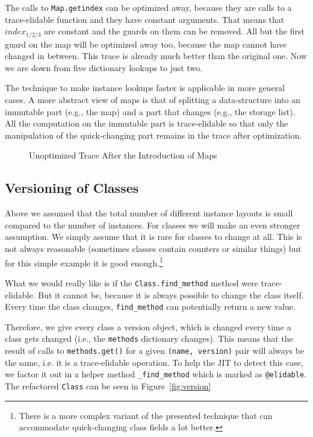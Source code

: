 \documentclass[preprint]{sigplanconf}
\newcommand\eg{e.g.,\xspace}
\begin{document}
The calls to \texttt{Map.getindex} can be optimized away, because they are calls to
a trace-elidable function and they have constant arguments. That means that $index_{1/2/3}$
are constant and the guards on them can be removed. All but the first guard on
the map will be optimized away too, because the map cannot have changed in
between. This trace is already much better than
the original one. Now we are down from five dictionary lookups to just two.

The technique to make instance lookups faster is applicable in more general
cases. A more abstract view of maps is that of splitting a data-structure into
an immutable part (\eg the map) and a part that changes (\eg the storage list).
All the computation on the immutable part is trace-elidable so that only the
manipulation of the quick-changing part remains in the trace after
optimization.

\begin{figure}

\caption{Unoptimized Trace After the Introduction of Maps}
\label{fig:trace2}
\end{figure}





\subsection{Versioning of Classes}

Above we assumed that the total number of
different instance layouts is small compared to the number of instances. For classes we
will make an even stronger assumption. We simply assume that it is rare for
classes to change at all. This is not always reasonable (sometimes classes contain
counters or similar things) but for this simple example it is good
enough.\footnote{There is a more complex variant of the presented technique that can
accommodate quick-changing class fields a lot better.}

What we would really like is if the \texttt{Class.find\_method} method were trace-elidable.
But it cannot be, because it is always possible to change the class itself.
Every time the class changes, \texttt{find\_method} can potentially return a
new value.

Therefore, we give every class a version object, which is changed every time a
class gets changed (i.e., the \texttt{methods} dictionary changes).
This means that the result of calls to \texttt{methods.get()} for a given \texttt{(name,
version)} pair will always be the same, i.e. it is a trace-elidable operation.  To help
the JIT to detect this case, we factor it out in a helper method \texttt{\_find\_method} which is
marked as \texttt{@elidable}. The refactored \texttt{Class} can
be seen in Figure~\ref{fig:version}
\end{document}
